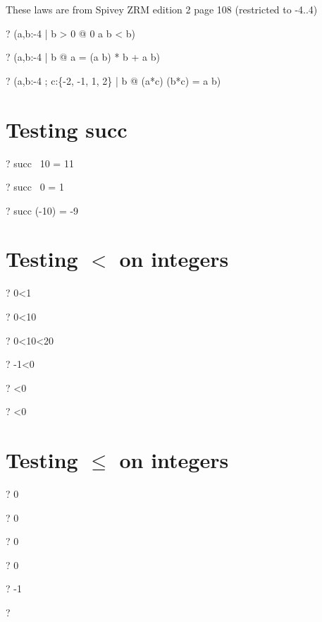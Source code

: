 \documentclass{article}
\newcommand{\negate}{-}
\begin{document}
 These laws are from Spivey ZRM edition 2 page 108 (restricted to -4..4)
\begin{zed} \vdash?   (\forall a,b:\negate 4  | b > 0 @ 0 \leq a \mod b < b) \end{zed}
\begin{zed} \vdash?   (\forall a,b:\negate 4  | b  @ a = (a \div b) * b + a \mod b) \end{zed}
\begin{zed} \vdash?   (\forall a,b:\negate 4 ; c:\{\negate 2, \negate 1, 1, 2\} | b  @ (a*c) \div (b*c) = a \div b) \end{zed}

\section{Testing succ}
\begin{zed} \vdash?   succ~ 10 = 11 \end{zed}
\begin{zed} \vdash?   succ~ 0 = 1 \end{zed}
\begin{zed} \vdash?   succ (\negate 10) = \negate 9 \end{zed}

\section{Testing $<$ on integers}
\begin{zed} \vdash?   0<1 \end{zed}
\begin{zed} \vdash?   0<10 \end{zed}
\begin{zed} \vdash?   0<10<20 \end{zed}
\begin{zed} \vdash?   \negate 1<0 \end{zed}
\begin{zed} \vdash?   <0 \end{zed}
\begin{zed} \vdash?   <0 \end{zed}

\section{Testing $\leq$ on integers}
\begin{zed} \vdash?   0  \end{zed}
\begin{zed} \vdash?   0  \end{zed}
\begin{zed} \vdash?   0  \end{zed}
\begin{zed} \vdash?   0   \end{zed}
\begin{zed} \vdash?   \negate 1  \end{zed}
\begin{zed} \vdash?     \end{zed}
\end{document}

